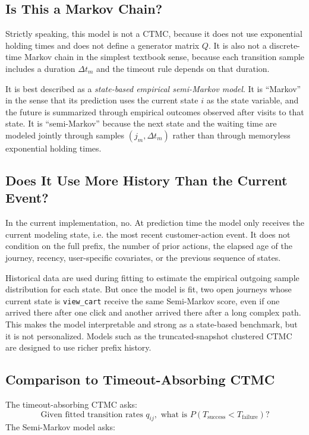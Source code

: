 \documentclass[11pt]{article}
\begin{document}
\subsection{Is This a Markov Chain?}

Strictly speaking, this model is not a CTMC, because it does not use
exponential holding times and does not define a generator matrix $Q$. It is
also not a discrete-time Markov chain in the simplest textbook sense, because
each transition sample includes a duration $\Delta t_m$ and the timeout rule
depends on that duration.

It is best described as a \emph{state-based empirical semi-Markov model}. It is
``Markov'' in the sense that its prediction uses the current state $i$ as the
state variable, and the future is summarized through empirical outcomes
observed after visits to that state. It is ``semi-Markov'' because the next
state and the waiting time are modeled jointly through samples
$(j_m,\Delta t_m)$ rather than through memoryless exponential holding times.

\subsection{Does It Use More History Than the Current Event?}

In the current implementation, no. At prediction time the model only receives
the current modeling state, i.e. the most recent customer-action event. It does
not condition on the full prefix, the number of prior actions, the elapsed age
of the journey, recency, user-specific covariates, or the previous sequence of
states.

Historical data are used during fitting to estimate the empirical outgoing
sample distribution for each state. But once the model is fit, two open
journeys whose current state is \texttt{view\_cart} receive the same
Semi-Markov score, even if one arrived there after one click and another
arrived there after a long complex path. This makes the model interpretable and
strong as a state-based benchmark, but it is not personalized. Models such as
the truncated-snapshot clustered CTMC are designed to use richer prefix history.

\subsection{Comparison to Timeout-Absorbing CTMC}

The timeout-absorbing CTMC asks:
\[
    \text{Given fitted transition rates } q_{ij}, \text{ what is }
    P(T_{\text{success}} < T_{\text{failure}})?
\]
The Semi-Markov model asks:
\end{document}
